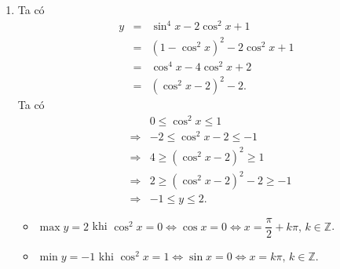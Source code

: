 \begin{ex}
{\begin{enumerate}
\begin{itemize}
				 \item $\min y=0$ khi $\sin x=-1\Leftrightarrow x=-\dfrac{\pi}{2}+k2\pi,\,k\in\mathbb{Z}$.
			\end{itemize}
			 \item Ta có \allowdisplaybreaks
			\begin{eqnarray*}
				y& =& \sin^4 x - 2\cos^2  x + 1 \\
				&=& (1-\cos^2 x)^2 - 2\cos^2  x + 1\\
				& =& \cos^4 x - 4\cos^2 x + 2  \\
				&=& (\cos^2  x - 2)^2 - 2.
			\end{eqnarray*}
			 Ta có
			\allowdisplaybreaks 
			\begin{eqnarray*}
				&&0 \leq \cos^2 x \leq  1 \\
				&\Rightarrow& -2 \leq \cos^2 x - 2 \leq -1  \\
				&\Rightarrow& 4 \geq (\cos^2 x - 2)^2  \geq 1\\
				&\Rightarrow& 2 \geq (\cos^2 x - 2)^2 -  2 \geq -1 \\
				&\Rightarrow&  -1 \leq y \leq 2.
			\end{eqnarray*}
			\begin{itemize}
				\item $\max y=2$ khi $\cos^2x=0\Leftrightarrow\cos x=0\Leftrightarrow  x=\dfrac{\pi}{2}+k\pi,\,k\in\mathbb{Z}$.
				\item $\min y=-1$ khi $\cos^2x=1\Leftrightarrow\sin x=0\Leftrightarrow  x=k\pi,\, k\in\mathbb{Z}$.
			\end{itemize}
		\end{enumerate}
	} 
\end{ex}

